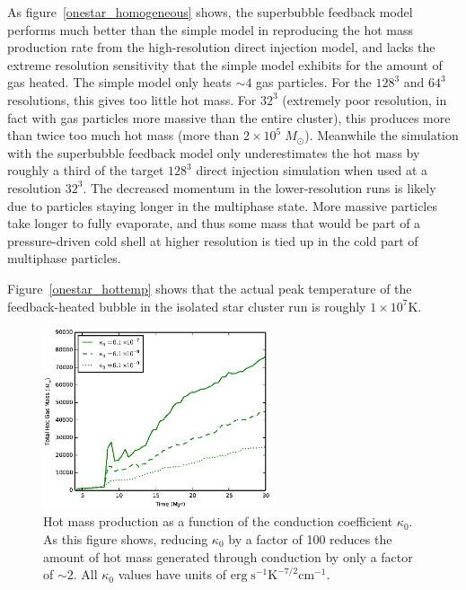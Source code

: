 As figure~\ref{onestar_homogeneous} shows, the superbubble feedback model
performs much better than the simple model in reproducing the hot mass
production rate from the high-resolution direct injection model, and lacks the
extreme resolution sensitivity that the simple model exhibits for the amount of
gas heated. The simple model only heats $\sim 4$ gas particles.  For the $128^3$
and $64^3$ resolutions, this gives too little hot mass.  For $32^3$ (extremely
poor resolution, in fact with gas particles more massive than the entire
cluster), this produces more than twice too much hot mass (more than
$2\times10^5\;M_\odot$). Meanwhile the simulation with the superbubble feedback
model only underestimates the hot mass by roughly a third of the target $128^3$
direct injection simulation when used at a resolution $32^3$.  The decreased
momentum in the lower-resolution runs is likely due to particles staying longer
in the multiphase state.  More massive particles take longer to fully evaporate,
and thus some mass that would be part of a pressure-driven cold shell at higher
resolution is tied up in the cold part of multiphase particles.

Figure~\ref{onestar_hottemp}  shows that the actual peak temperature of the
feedback-heated bubble in the isolated star cluster run is roughly
$1\times10^7\mathrm{K}$.


\begin{figure}
    \includegraphics[width=0.6\textwidth]{figures1/onestar_kappa.eps}
    \caption[Dependence of superbubble heated gas on conduction coefficient]{Hot
    mass production as a function of the conduction coefficient $\kappa_0$.  As
    this figure shows, reducing $\kappa_0$ by a factor of 100 reduces the amount
    of hot mass generated through conduction by only a factor of $\sim2$. All
    $\kappa_0$ values have units of $\mathrm{erg\; s^{-1} K^{-7/2} cm^{-1}}$.}
    \label{onestar_kappa}
\end{figure}

